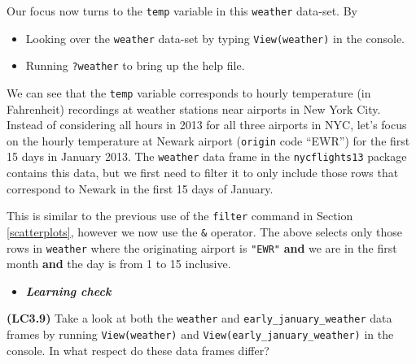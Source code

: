 \documentclass[12pt,]{krantz}
\makeatletter
\newenvironment{Shaded}{\begin{snugshade}}{\end{snugshade}}
\newcommand{\KeywordTok}[1]{\textcolor[rgb]{0.27,0.27,0.27}{\textbf{#1}}}
\newcommand{\DecValTok}[1]{\textcolor[rgb]{0.06,0.06,0.06}{#1}}
\newcommand{\StringTok}[1]{\textcolor[rgb]{0.5,0.5,0.5}{#1}}
\newcommand{\OperatorTok}[1]{\textcolor[rgb]{0.43,0.43,0.43}{\textbf{#1}}}
\newcommand{\NormalTok}[1]{#1}
\providecommand{\tightlist}{%
  \setlength{\itemsep}{0pt}\setlength{\parskip}{0pt}}
\newenvironment{kframe}{%
\medskip{}
\setlength{\fboxsep}{.8em}
 \def\at@end@of@kframe{}%
 \ifinner\ifhmode%
  \def\at@end@of@kframe{\end{minipage}}%
  \begin{minipage}{\columnwidth}%
 \fi\fi%
 \def\FrameCommand##1{\hskip\@totalleftmargin \hskip-\fboxsep
 \colorbox{shadecolor}{##1}\hskip-\fboxsep
     \hskip-\linewidth \hskip-\@totalleftmargin \hskip\columnwidth}%
 \MakeFramed {\advance\hsize-\width
   \@totalleftmargin\z@ \linewidth\hsize
   \@setminipage}}%
 {\par\unskip\endMakeFramed%
 \at@end@of@kframe}
\renewenvironment{Shaded}{\begin{kframe}}{\end{kframe}}
\newenvironment{rmdblock}[1]
  {\begin{shaded*}
  \begin{itemize}
  \renewcommand{\labelitemi}{
    \raisebox{-.7\height}[0pt][0pt]{
    }
  }
  \item
  }
  {
  \end{itemize}
  \end{shaded*}
  }
\newenvironment{learncheck}
  {\begin{rmdblock}{warning}}
  {\end{rmdblock}}
\theoremstyle{definition}
\theoremstyle{definition}
\theoremstyle{definition}
\theoremstyle{remark}
\makeatother
\begin{document}
Our focus now turns to the \texttt{temp} variable in this
\texttt{weather} data-set. By

\begin{itemize}
\tightlist
\item
  Looking over the \texttt{weather} data-set by typing
  \texttt{View(weather)} in the console.
\item
  Running \texttt{?weather} to bring up the help file.
\end{itemize}

We can see that the \texttt{temp} variable corresponds to hourly
temperature (in Fahrenheit) recordings at weather stations near airports
in New York City. Instead of considering all hours in 2013 for all three
airports in NYC, let's focus on the hourly temperature at Newark airport
(\texttt{origin} code ``EWR'') for the first 15 days in January 2013.
The \texttt{weather} data frame in the \texttt{nycflights13} package
contains this data, but we first need to filter it to only include those
rows that correspond to Newark in the first 15 days of January.

\begin{Shaded}
\end{Shaded}

This is similar to the previous use of the \texttt{filter} command in
Section \ref{scatterplots}, however we now use the \texttt{\&} operator.
The above selects only those rows in \texttt{weather} where the
originating airport is \texttt{"EWR"} \textbf{and} we are in the first
month \textbf{and} the day is from 1 to 15 inclusive.

\begin{learncheck}
\textbf{\emph{Learning check}}
\end{learncheck}

\textbf{(LC3.9)} Take a look at both the \texttt{weather} and
\texttt{early\_january\_weather} data frames by running
\texttt{View(weather)} and \texttt{View(early\_january\_weather)} in the
console. In what respect do these data frames differ?
\end{document}
